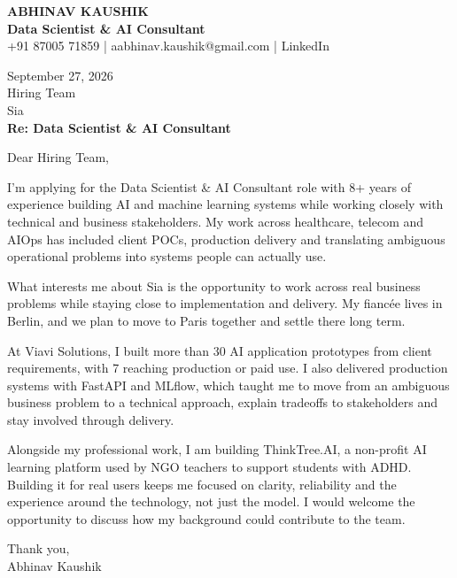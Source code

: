 \documentclass[10pt,a4paper]{article}
\begin{document}
\begin{center}
{\Large\bfseries ABHINAV KAUSHIK}\\[2pt]
{\bfseries Data Scientist \& AI Consultant}\\[2pt]
+91 87005 71859 \quad | \quad aabhinav.kaushik@gmail.com \quad | \quad LinkedIn
\end{center}
\vspace{8pt}
September 27, 2026\\[6pt]
Hiring Team\\
Sia\\[4pt]
\textbf{Re: Data Scientist \& AI Consultant}

Dear Hiring Team,

I’m applying for the Data Scientist \& AI Consultant role with 8+ years of experience building AI and machine learning systems while working closely with technical and business stakeholders. My work across healthcare, telecom and AIOps has included client POCs, production delivery and translating ambiguous operational problems into systems people can actually use.

What interests me about Sia is the opportunity to work across real business problems while staying close to implementation and delivery. My fiancée lives in Berlin, and we plan to move to Paris together and settle there long term.

At Viavi Solutions, I built more than 30 AI application prototypes from client requirements, with 7 reaching production or paid use. I also delivered production systems with FastAPI and MLflow, which taught me to move from an ambiguous business problem to a technical approach, explain tradeoffs to stakeholders and stay involved through delivery.

Alongside my professional work, I am building ThinkTree.AI, a non-profit AI learning platform used by NGO teachers to support students with ADHD. Building it for real users keeps me focused on clarity, reliability and the experience around the technology, not just the model. I would welcome the opportunity to discuss how my background could contribute to the team.

Thank you,\\
Abhinav Kaushik
\end{document}
